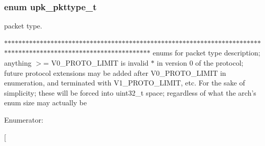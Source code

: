 \subsubsection[{upk\_\-pkttype\_\-t}]{\setlength{\rightskip}{0pt plus 5cm}enum {\bf upk\_\-pkttype\_\-t}}\label{group__client__protocol_ga434039581eb81ed8ad335ab19ad1d126}


packet type. 

$\ast$$\ast$$\ast$$\ast$$\ast$$\ast$$\ast$$\ast$$\ast$$\ast$$\ast$$\ast$$\ast$$\ast$$\ast$$\ast$$\ast$$\ast$$\ast$$\ast$$\ast$$\ast$$\ast$$\ast$$\ast$$\ast$$\ast$$\ast$$\ast$$\ast$$\ast$$\ast$$\ast$$\ast$$\ast$$\ast$$\ast$$\ast$$\ast$$\ast$$\ast$$\ast$$\ast$$\ast$$\ast$$\ast$$\ast$$\ast$$\ast$$\ast$$\ast$$\ast$$\ast$$\ast$$\ast$$\ast$$\ast$$\ast$$\ast$$\ast$$\ast$$\ast$$\ast$$\ast$$\ast$$\ast$$\ast$$\ast$$\ast$$\ast$$\ast$$\ast$$\ast$$\ast$$\ast$$\ast$$\ast$$\ast$$\ast$$\ast$$\ast$$\ast$$\ast$$\ast$$\ast$$\ast$$\ast$$\ast$$\ast$$\ast$$\ast$$\ast$$\ast$$\ast$$\ast$$\ast$$\ast$$\ast$$\ast$$\ast$$\ast$$\ast$$\ast$$\ast$$\ast$$\ast$$\ast$$\ast$$\ast$$\ast$$\ast$$\ast$$\ast$ enums for packet type description; anything $>$= V0\_\-PROTO\_\-LIMIT is invalid $\ast$ in version 0 of the protocol; future protocol extensions may be added after V0\_\-PROTO\_\-LIMIT in enumeration, and terminated with V1\_\-PROTO\_\-LIMIT, etc. For the sake of simplicity; these will be forced into uint32\_\-t space; regardless of what the arch's enum size may actually be \begin{Desc}
\item[Enumerator: ]\par
\begin{description}
\item[{\em 
PKT\_\-REQUEST\label{group__client__protocol_ga434039581eb81ed8ad335ab19ad1d126a43f9e2f1883bc88517b6e918e544c1e0}
}]\item[{\em 
PKT\_\-REPLY\label{group__client__protocol_ga434039581eb81ed8ad335ab19ad1d126a7295c183b01607afd8a447ae0be1d52f}
}]\item[{\em 
}
\end{description}
\end{Desc}
